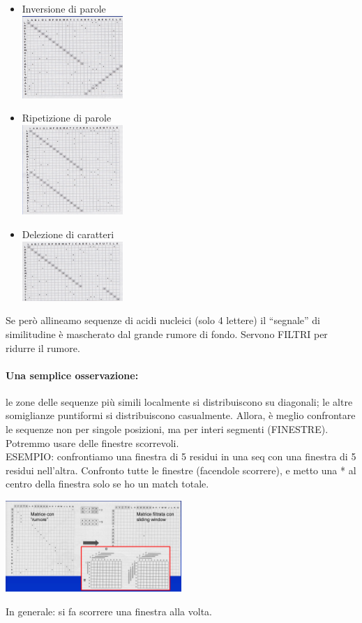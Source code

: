 \documentclass{article}
\begin{document}
\begin{itemize}
    \item Inversione di parole\\
    \includegraphics[width=0.3\textwidth]{figures/inv2.png}
    \item Ripetizione di parole\\
    \includegraphics[width=0.3\textwidth]{figures/rip.png}
    \item Delezione di caratteri\\
    \includegraphics[width=0.3\textwidth]{figures/del.png}
\end{itemize}
Se però allineamo sequenze di acidi nucleici (solo 4 lettere) il “segnale” di similitudine è mascherato dal grande rumore di fondo. Servono FILTRI per ridurre il rumore.
\paragraph{Una semplice osservazione:}le zone delle sequenze più simili
localmente si distribuiscono su diagonali; le altre somiglianze puntiformi si distribuiscono casualmente.
Allora, è meglio confrontare le sequenze non per singole posizioni, ma per interi segmenti (FINESTRE).\\
Potremmo usare delle finestre scorrevoli.\\
ESEMPIO: confrontiamo una finestra di 5 residui in una seq
con una finestra di 5 residui nell'altra. Confronto tutte le
finestre (facendole scorrere), e metto una * al centro della
finestra solo se ho un match totale.
\begin{center}
    \includegraphics[width=0.5\textwidth]{figures/sliding.png}
\end{center}
In generale: si fa scorrere una finestra alla volta.
\end{document}

